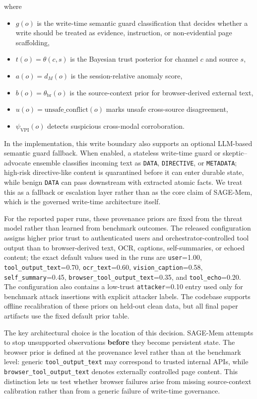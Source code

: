 \documentclass{article}
\begin{document}
where
\begin{itemize}
\item \(g(o)\) is the write-time semantic guard classification that decides whether a write should be treated as evidence, instruction, or non-evidential page scaffolding,
\item \(t(o)=\theta(c,s)\) is the Bayesian trust posterior for channel \(c\) and source \(s\),
\item \(a(o)=d_M(o)\) is the session-relative anomaly score,
\item \(b(o)=\theta_{\mathrm{br}}(o)\) is the source-context prior for browser-derived external text,
\item \(u(o)=\mathrm{unsafe\_conflict}(o)\) marks unsafe cross-source disagreement,
\item \(\psi_{\mathrm{VPI}}(o)\) detects suspicious cross-modal corroboration.
\end{itemize}

In the implementation, this write boundary also supports an optional LLM-based semantic guard fallback. When enabled, a stateless write-time guard or skeptic--advocate ensemble classifies incoming text as \texttt{DATA}, \texttt{DIRECTIVE}, or \texttt{METADATA}; high-risk directive-like content is quarantined before it can enter durable state, while benign \texttt{DATA} can pass downstream with extracted atomic facts. We treat this as a fallback or escalation layer rather than as the core claim of SAGE-Mem, which is the governed write-time architecture itself.

For the reported paper runs, these provenance priors are fixed from the threat model rather than learned from benchmark outcomes. The released configuration assigns higher prior trust to authenticated users and orchestrator-controlled tool output than to browser-derived text, OCR, captions, self-summaries, or echoed content; the exact default values used in the runs are \texttt{user}=1.00, \texttt{tool\_output\_text}=0.70, \texttt{ocr\_text}=0.60, \texttt{vision\_caption}=0.58, \texttt{self\_summary}=0.45, \texttt{browser\_tool\_output\_text}=0.35, and \texttt{tool\_echo}=0.20. The configuration also contains a low-trust \texttt{attacker}=0.10 entry used only for benchmark attack insertions with explicit attacker labels. The codebase supports offline recalibration of these priors on held-out clean data, but all final paper artifacts use the fixed default prior table.

The key architectural choice is the location of this decision. SAGE-Mem attempts to stop unsupported observations \textbf{before} they become persistent state. The browser prior is defined at the provenance level rather than at the benchmark level: generic \texttt{tool\_output\_text} may correspond to trusted internal APIs, while \texttt{browser\_tool\_output\_text} denotes externally controlled page content. This distinction lets us test whether browser failures arise from missing source-context calibration rather than from a generic failure of write-time governance.
\end{document}

